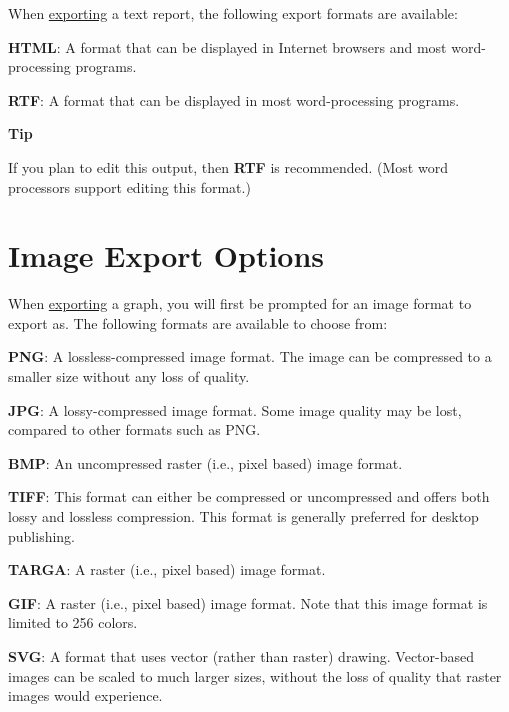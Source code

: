 \documentclass[
]{book}
\newenvironment{tipsection}
    {
    \begin{tcolorbox}[colframe=lightgray,colback=lightyellow,arc=3mm]
    \faLightbulb[regular] \textbf{Tip} \newline
    }
    {
    \end{tcolorbox}
    }
\newenvironment{optionssection}
    {
    \begin{tcolorbox}[colframe=lightgray,colback=ultralightgray,sharp corners=all,parbox=false]
    }
    {
    \end{tcolorbox}
    }
\theoremstyle{definition}
\theoremstyle{definition}
\theoremstyle{definition}
\theoremstyle{definition}
\theoremstyle{remark}
\begin{document}
When \protect\hyperlink{exporting}{exporting} a text report, the following export formats are available:

\begin{optionssection}
\textbf{HTML}: A format that can be displayed in Internet browsers and most word-processing programs.

\textbf{RTF}: A format that can be displayed in most word-processing programs.

\end{optionssection}

\begin{tipsection}
If you plan to edit this output, then \textbf{RTF} is recommended. (Most word processors support editing this format.)

\end{tipsection}

\hypertarget{image-export}{%
\section{Image Export Options}\label{image-export}}

When \protect\hyperlink{exporting}{exporting} a graph, you will first be prompted for an image format to export as. The following formats are available to choose from:

\begin{optionssection}
\textbf{PNG}: A lossless-compressed image format. The image can be compressed to a smaller size without any loss of quality.

\textbf{JPG}: A lossy-compressed image format. Some image quality may be lost, compared to other formats such as PNG.

\textbf{BMP}: An uncompressed raster (i.e., pixel based) image format.

\textbf{TIFF}: This format can either be compressed or uncompressed and offers both lossy and lossless compression. This format is generally preferred for desktop publishing.

\textbf{TARGA}: A raster (i.e., pixel based) image format.

\textbf{GIF}: A raster (i.e., pixel based) image format. Note that this image format is limited to 256 colors.

\textbf{SVG}: A format that uses vector (rather than raster) drawing. Vector-based images can be scaled to much larger sizes, without the loss of quality that raster images would experience.

\end{optionssection}
\end{document}
